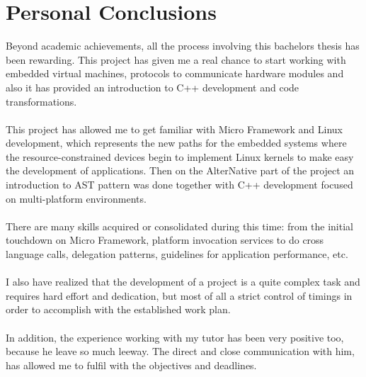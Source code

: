 \section{Personal Conclusions}\label{S:Personal-Conclusions}
Beyond academic achievements, all the process involving this bachelors thesis has been rewarding. This project has given me a real chance to start working with embedded virtual machines, protocols to communicate hardware modules and also it has provided an introduction to C++ development and code transformations.
\\
\\
This project has allowed me to get familiar with Micro Framework and Linux development, which represents the new paths for the embedded systems where the resource-constrained devices begin to implement Linux kernels to make easy the development of applications. Then on the AlterNative part of the project an introduction to AST pattern was done together with C++ development focused on multi-platform environments. 
\\
\\
There are many skills acquired or consolidated during this time: from the initial touchdown on Micro Framework, platform invocation services to do cross language calls, delegation patterns, guidelines for application performance, etc.
\\
\\
I also have realized that the development of a project is a quite complex task and requires hard effort and dedication, but most of all a strict control of timings in order to accomplish with the established work plan.
\\
\\
In addition, the experience working with my tutor has been very positive too, because he leave so much leeway. The direct and close communication with him, has allowed me to fulfil with the objectives and deadlines.


